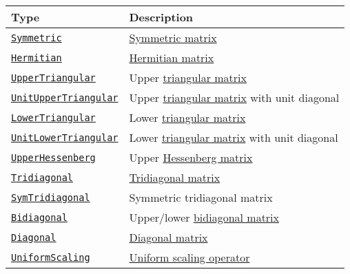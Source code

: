 \begin{table}[h]

\begin{tabulary}{\linewidth}{|L|L|}
\hline
Type & Description \\
\hline
\hyperlink{17683454167504168761}{\texttt{Symmetric}} & \href{https://en.wikipedia.org/wiki/Symmetric\_matrix}{Symmetric matrix} \\
\hline
\hyperlink{938713992181310063}{\texttt{Hermitian}} & \href{https://en.wikipedia.org/wiki/Hermitian\_matrix}{Hermitian matrix} \\
\hline
\hyperlink{6344726545165008167}{\texttt{UpperTriangular}} & Upper \href{https://en.wikipedia.org/wiki/Triangular\_matrix}{triangular matrix} \\
\hline
\hyperlink{17221720404477798393}{\texttt{UnitUpperTriangular}} & Upper \href{https://en.wikipedia.org/wiki/Triangular\_matrix}{triangular matrix} with unit diagonal \\
\hline
\hyperlink{15116078732779234709}{\texttt{LowerTriangular}} & Lower \href{https://en.wikipedia.org/wiki/Triangular\_matrix}{triangular matrix} \\
\hline
\hyperlink{2163321084999097240}{\texttt{UnitLowerTriangular}} & Lower \href{https://en.wikipedia.org/wiki/Triangular\_matrix}{triangular matrix} with unit diagonal \\
\hline
\hyperlink{6167777885202579792}{\texttt{UpperHessenberg}} & Upper \href{https://en.wikipedia.org/wiki/Hessenberg\_matrix}{Hessenberg matrix} \\
\hline
\hyperlink{17820886359515748171}{\texttt{Tridiagonal}} & \href{https://en.wikipedia.org/wiki/Tridiagonal\_matrix}{Tridiagonal matrix} \\
\hline
\hyperlink{6062797780727203318}{\texttt{SymTridiagonal}} & Symmetric tridiagonal matrix \\
\hline
\hyperlink{6156150905679680892}{\texttt{Bidiagonal}} & Upper/lower \href{https://en.wikipedia.org/wiki/Bidiagonal\_matrix}{bidiagonal matrix} \\
\hline
\hyperlink{3300114559258360989}{\texttt{Diagonal}} & \href{https://en.wikipedia.org/wiki/Diagonal\_matrix}{Diagonal matrix} \\
\hline
\hyperlink{723087258311673942}{\texttt{UniformScaling}} & \href{https://en.wikipedia.org/wiki/Uniform\_scaling}{Uniform scaling operator} \\
\hline
\end{tabulary}

\end{table}




